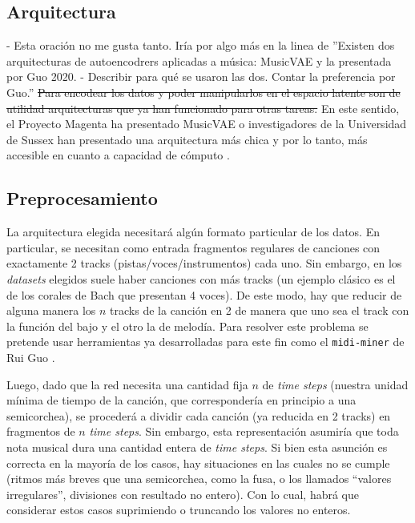 \documentclass[10pt]{article}
\newcommand{\suggestM}[2]{{\color{orange} #1}{ \color{red}\sout{#2}}}
\begin{document}
\subsection*{Arquitectura}
\suggestM{- Esta oración no me gusta tanto. Iría por algo más en la linea de ''Existen dos arquitecturas de autoencodrers aplicadas a música: MusicVAE y la presentada por Guo 2020. - Describir para qué se usaron las dos. Contar la preferencia por Guo.''}{Para encodear los datos y poder manipularlos en el espacio latente son de utilidad arquitecturas que ya han funcionado para otras tareas.} En este sentido, el Proyecto Magenta ha presentado MusicVAE \cite{roberts2019musicvae} o investigadores de la Universidad de Sussex han presentado una arquitectura más chica y por lo tanto, más accesible en cuanto a capacidad de cómputo \cite{guo2020variational}.

\subsection*{Preprocesamiento}
La arquitectura elegida necesitará algún formato particular de los datos. En particular, se necesitan como entrada fragmentos regulares de canciones con exactamente 2 tracks (pistas/voces/instrumentos) cada uno. Sin embargo, en los \textit{datasets} elegidos suele haber canciones con más tracks (un ejemplo clásico es el de los corales de Bach que presentan 4 voces). De este modo, hay que reducir de alguna manera los $n$ tracks de la canción en 2 de manera que uno sea el track con la función del bajo y el otro la de melodía. Para resolver este problema se pretende usar herramientas ya desarrolladas para este fin como el \texttt{midi-miner} de Rui Guo \cite{Guo-reduccion}.

Luego, dado que la red necesita una cantidad fija $n$ de \textit{time steps} (nuestra unidad mínima de tiempo de la canción, que correspondería en principio a una semicorchea), se procederá a dividir cada canción (ya reducida en 2 tracks) en fragmentos de $n$ \textit{time steps}. Sin embargo, esta representación asumiría que toda nota musical dura una cantidad entera de \textit{time steps}. Si bien esta asunción es correcta en la mayoría de los casos, hay situaciones en las cuales no se cumple (ritmos más breves que una semicorchea, como la fusa, o los llamados ``valores irregulares'', divisiones con resultado no entero). Con lo cual, habrá que considerar estos casos suprimiendo o truncando los valores no enteros.
\end{document}
